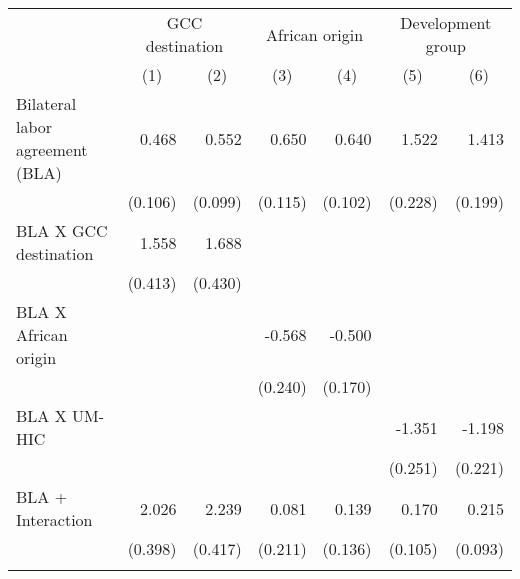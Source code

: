 \begin{tabular}{l*{6}{r}} \toprule
                    &\multicolumn{2}{c}{GCC destination}        &\multicolumn{2}{c}{African origin}         &\multicolumn{2}{c}{Development group}      \\\cmidrule(lr){2-3}\cmidrule(lr){4-5}\cmidrule(lr){6-7}
                    &\multicolumn{1}{c}{(1)}         &\multicolumn{1}{c}{(2)}         &\multicolumn{1}{c}{(3)}         &\multicolumn{1}{c}{(4)}         &\multicolumn{1}{c}{(5)}         &\multicolumn{1}{c}{(6)}         \\
\midrule
Bilateral labor agreement (BLA)&       0.468\sym{***}&       0.552\sym{***}&       0.650\sym{***}&       0.640\sym{***}&       1.522\sym{***}&       1.413\sym{***}\\
                    &     (0.106)         &     (0.099)         &     (0.115)         &     (0.102)         &     (0.228)         &     (0.199)         \\
BLA X GCC destination&       1.558\sym{***}&       1.688\sym{***}&                     &                     &                     &                     \\
                    &     (0.413)         &     (0.430)         &                     &                     &                     &                     \\
BLA X African origin&                     &                     &      -0.568\sym{**} &      -0.500\sym{***}&                     &                     \\
                    &                     &                     &     (0.240)         &     (0.170)         &                     &                     \\
BLA X UM-HIC        &                     &                     &                     &                     &      -1.351\sym{***}&      -1.198\sym{***}\\
                    &                     &                     &                     &                     &     (0.251)         &     (0.221)         \\
\addlinespace
BLA + Interaction   &       2.026\sym{***}&       2.239\sym{***}&       0.081         &       0.139         &       0.170         &       0.215\sym{**} \\
                    &     (0.398)         &     (0.417)         &     (0.211)         &     (0.136)         &     (0.105)         &     (0.093)         \\\bottomrule
\addlinespace
\addlinespace

\end{tabular}

